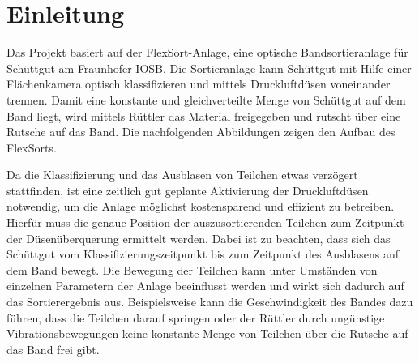 \section{Einleitung}

Das Projekt basiert auf der FlexSort-Anlage, eine optische Bandsortieranlage für Schüttgut am Fraunhofer IOSB. Die Sortieranlage kann Schüttgut mit Hilfe einer Flächenkamera optisch klassifizieren und mittels Druckluftdüsen voneinander trennen. Damit eine konstante und gleichverteilte Menge von Schüttgut auf dem Band liegt, wird mittels Rüttler das Material freigegeben und rutscht über eine Rutsche auf das Band. Die nachfolgenden Abbildungen zeigen den Aufbau des FlexSorts.

%


Da die Klassifizierung und das Ausblasen von Teilchen etwas verzögert stattfinden, ist eine zeitlich gut geplante Aktivierung der Druckluftdüsen notwendig, um die Anlage möglichst kostensparend und effizient zu betreiben. Hierfür muss die genaue Position der auszusortierenden Teilchen zum Zeitpunkt der Düsenüberquerung ermittelt werden. Dabei ist zu beachten, dass sich das Schüttgut vom Klassifizierungszeitpunkt bis zum Zeitpunkt des Ausblasens auf dem Band bewegt. Die Bewegung der Teilchen kann unter Umständen von einzelnen Parametern der Anlage beeinflusst werden und wirkt sich dadurch auf das Sortierergebnis aus. Beispielsweise kann die Geschwindigkeit des Bandes dazu führen, dass die Teilchen darauf springen oder der Rüttler durch ungünstige Vibrationsbewegungen keine konstante Menge von Teilchen über die Rutsche auf das Band frei gibt. 

